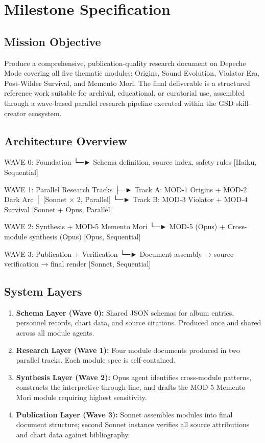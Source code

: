 \documentclass[11pt,letterpaper]{article}
\begin{document}
\section{Milestone Specification}

\subsection{Mission Objective}

Produce a comprehensive, publication-quality research document on Depeche Mode covering all five thematic modules: Origins, Sound Evolution, Violator Era, Post-Wilder Survival, and Memento Mori. The final deliverable is a structured reference work suitable for archival, educational, or curatorial use, assembled through a wave-based parallel research pipeline executed within the GSD skill-creator ecosystem.

\subsection{Architecture Overview}

\begin{asciibox}
WAVE 0: Foundation
  └─► Schema definition, source index, safety rules
      [Haiku, Sequential]

WAVE 1: Parallel Research Tracks
  ├─► Track A: MOD-1 Origins + MOD-2 Dark Arc
  │   [Sonnet × 2, Parallel]
  └─► Track B: MOD-3 Violator + MOD-4 Survival
      [Sonnet + Opus, Parallel]

WAVE 2: Synthesis + MOD-5 Memento Mori
  └─► MOD-5 (Opus) + Cross-module synthesis (Opus)
      [Opus, Sequential]

WAVE 3: Publication + Verification
  └─► Document assembly → source verification → final render
      [Sonnet, Sequential]
\end{asciibox}

\subsection{System Layers}

\begin{enumerate}
  \item \textbf{Schema Layer (Wave 0):} Shared JSON schemas for album entries, personnel records, chart data, and source citations. Produced once and shared across all module agents.
  \item \textbf{Research Layer (Wave 1):} Four module documents produced in two parallel tracks. Each module spec is self-contained.
  \item \textbf{Synthesis Layer (Wave 2):} Opus agent identifies cross-module patterns, constructs the interpretive through-line, and drafts the MOD-5 Memento Mori module requiring highest sensitivity.
  \item \textbf{Publication Layer (Wave 3):} Sonnet assembles modules into final document structure; second Sonnet instance verifies all source attributions and chart data against bibliography.
\end{enumerate}
\end{document}
